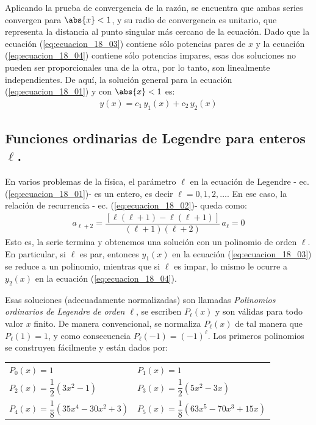 Aplicando la prueba de convergencia de la razón, se encuentra que ambas series convergen para $\abs{x} < 1$, y su radio de convergencia es unitario, que representa la distancia al punto singular más cercano de la ecuación. Dado que la ecuación (\ref{eq:ecuacion_18_03}) contiene sólo potencias pares de $x$ y la ecuación (\ref{eq:ecuacion_18_04}) contiene sólo potencias impares, esas dos soluciones no pueden ser proporcionales una de la otra, por lo tanto, son linealmente independientes. De aquí, la solución general para la ecuación (\ref{eq:ecuacion_18_01}) y con $\abs{x} < 1$ es:
\begin{align*}
y(x) = c_{1} \, y_{1} (x) + c_{2} \, y_{2} (x)
\end{align*}

\subsection{Funciones ordinarias de Legendre para enteros \texorpdfstring{$\ell$}{l}.}
En varios problemas de la física, el parámetro $\ell$ en la ecuación de Legendre - ec. (\ref{eq:ecuacion_18_01})- es un entero, es decir $\ell = 0,1,2,\ldots$. En ese caso, la relación de recurrencia - ec. (\ref{eq:ecuacion_18_02})- queda como:
\begin{align*}
a_{\ell + 2} = \dfrac{[ \ell (\ell + 1) - \ell (\ell + 1) ]}{(\ell + 1)(\ell + 2)} \, a_{\ell} = 0
\end{align*}
Esto es, la serie termina y obtenemos una solución con un polinomio de orden $\ell$. En particular, si $\ell$ es par, entonces $y_{1} (x)$ en la ecuación (\ref{eq:ecuacion_18_03}) se reduce a un polinomio, mientras que si $\ell$ es impar, lo mismo le ocurre a $y_{2} (x)$ en la ecuación (\ref{eq:ecuacion_18_04}).
\par
Esas soluciones (adecuadamente normalizadas) son llamadas \emph{Polinomios ordinarios de Legendre de orden $\ell$}, se escriben $P_{\ell} (x)$ y son válidas para todo valor $x$ finito. De manera convencional, se normaliza $P_{\ell} (x)$ de tal manera que $P_{\ell}(1) =  1$, y como consecuencia $P_{\ell} (-1) = (-1)^{\ell}$. Los primeros polinomios se construyen fácilmente y están dados por:
\begin{center}
\begin{tabular}{l l}
$P_{0} (x) = 1 $ & $P_{1}(x) = 1 $ \\[0.5em]
$P_{2} (x) = \dfrac{1}{2} (3 x^{2} - 1)$ & $P_{3} (x) = \dfrac{1}{2} (5 x^{2} - 3 x)$ \\[0.5em] 
$P_{4} (x) = \dfrac{1}{8} (35 x^{4} - 30 x^{2} + 3)$ & $P_{5} (x) = \dfrac{1}{8} (63 x^{5} - 70 x^{3} + 15 x)$
\end{tabular}
\end{center}
